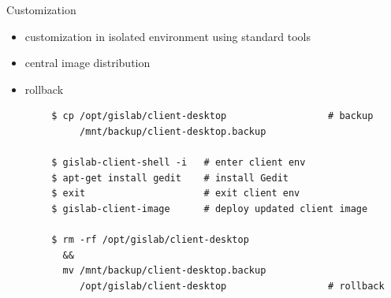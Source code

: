 \documentclass[12pt]{beamer}
\begin{document}
\begin{frame}[fragile]{Customization}
	\begin{itemize}
		\item customization in isolated environment using standard tools
		\item central image distribution
		\item rollback
	\end{itemize}
	
	\lstset{language=sh}
	\begin{lstlisting}
		$ cp /opt/gislab/client-desktop                  # backup
		     /mnt/backup/client-desktop.backup
		
		$ gislab-client-shell -i   # enter client env
		$ apt-get install gedit    # install Gedit
		$ exit                     # exit client env
		$ gislab-client-image      # deploy updated client image
		
		$ rm -rf /opt/gislab/client-desktop
		  &&
		  mv /mnt/backup/client-desktop.backup
		     /opt/gislab/client-desktop                  # rollback
	\end{lstlisting}
\end{frame}




\end{document}

